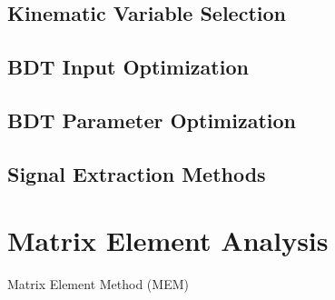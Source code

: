 \subsection{Kinematic Variable Selection}
\subsection{BDT Input Optimization}
\subsection{BDT Parameter Optimization}
\subsection{Signal Extraction Methods}

\section{Matrix Element Analysis}
Matrix Element Method (MEM)


